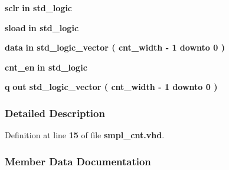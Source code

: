 \begin{DoxyCompactItemize}
\item 
{\bf sclr}  {\bfseries {\bfseries \textcolor{keywordflow}{in}\textcolor{vhdlchar}{ }}} {\bfseries \textcolor{comment}{std\+\_\+logic}\textcolor{vhdlchar}{ }} 
\item 
{\bf sload}  {\bfseries {\bfseries \textcolor{keywordflow}{in}\textcolor{vhdlchar}{ }}} {\bfseries \textcolor{comment}{std\+\_\+logic}\textcolor{vhdlchar}{ }} 
\item 
{\bf data}  {\bfseries {\bfseries \textcolor{keywordflow}{in}\textcolor{vhdlchar}{ }}} {\bfseries \textcolor{comment}{std\+\_\+logic\+\_\+vector}\textcolor{vhdlchar}{ }\textcolor{vhdlchar}{(}\textcolor{vhdlchar}{ }\textcolor{vhdlchar}{ }\textcolor{vhdlchar}{ }\textcolor{vhdlchar}{ }{\bfseries {\bf cnt\+\_\+width}} \textcolor{vhdlchar}{-\/}\textcolor{vhdlchar}{ } \textcolor{vhdldigit}{1} \textcolor{vhdlchar}{ }\textcolor{keywordflow}{downto}\textcolor{vhdlchar}{ }\textcolor{vhdlchar}{ } \textcolor{vhdldigit}{0} \textcolor{vhdlchar}{ }\textcolor{vhdlchar}{)}\textcolor{vhdlchar}{ }} 
\item 
{\bf cnt\+\_\+en}  {\bfseries {\bfseries \textcolor{keywordflow}{in}\textcolor{vhdlchar}{ }}} {\bfseries \textcolor{comment}{std\+\_\+logic}\textcolor{vhdlchar}{ }} 
\item 
{\bf q}  {\bfseries {\bfseries \textcolor{keywordflow}{out}\textcolor{vhdlchar}{ }}} {\bfseries \textcolor{comment}{std\+\_\+logic\+\_\+vector}\textcolor{vhdlchar}{ }\textcolor{vhdlchar}{(}\textcolor{vhdlchar}{ }\textcolor{vhdlchar}{ }\textcolor{vhdlchar}{ }\textcolor{vhdlchar}{ }{\bfseries {\bf cnt\+\_\+width}} \textcolor{vhdlchar}{-\/}\textcolor{vhdlchar}{ } \textcolor{vhdldigit}{1} \textcolor{vhdlchar}{ }\textcolor{keywordflow}{downto}\textcolor{vhdlchar}{ }\textcolor{vhdlchar}{ } \textcolor{vhdldigit}{0} \textcolor{vhdlchar}{ }\textcolor{vhdlchar}{)}\textcolor{vhdlchar}{ }} 
\end{DoxyCompactItemize}


\subsubsection{Detailed Description}


Definition at line {\bf 15} of file {\bf smpl\+\_\+cnt.\+vhd}.



\subsubsection{Member Data Documentation}
